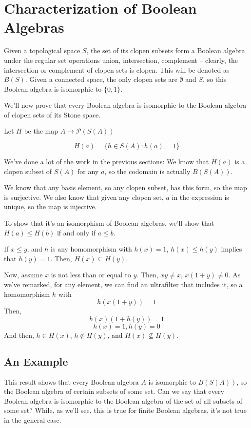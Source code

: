 \documentclass{article}
\begin{document}
    \section{Characterization of Boolean Algebras}

      Given a topological space $S$, the set of its clopen subsets form a
      Boolean algebra under the regular set operations union, intersection,
      complement -- clearly, the intersection or complement of clopen sets is
      clopen. This will be denoted as $B(S)$. Given a connected space, the only
      clopen sets are $\emptyset$ and $S$, so this Boolean algebra is isomorphic
      to $\{0,1\}$.

      We'll now prove that every Boolean algebra is isomorphic to the Boolean
      algebra of clopen sets of its Stone space.

      Let $H$ be the map $A \rightarrow \mathcal{P}(S(A))$

      \[H(a) = \{h \in S(A) : h(a) = 1\}\]

      We've done a lot of the work in the previous sections: We know that $H(a)$
      is a clopen subset of $S(A)$ for any $a$, so the codomain is actually
      $B(S(A))$.

      We know that any basis element, so any clopen subset, has this form, so
      the map is surjective.  We also know that given any clopen set, $a$ in the
      expression is unique, so the map is injective.

      To show that it's an isomorphism of Boolean algebras, we'll show that
      $H(a) \leq H(b)$ if and only if $a \leq b$.

      If $x \leq y$, and $h$ is any homomorphism with $h(x) = 1$, $h(x) \leq
      h(y)$ implies that $h(y) = 1$. Then, $H(x) \subseteq H(y)$.

      Now, assume $x$ is not less than or equal to $y$. Then, $xy \neq x$,
      $x(1+y) \neq 0$.  As we've remarked, for any element, we can find an
      ultrafilter that includes it, so a homomorphism $h$ with \[h(x(1+y)) = 1\]
      Then, \[h(x)(1+h(y)) = 1\] \[h(x) = 1, h(y) = 0\] And then, $h \in H(x)$,
      $h \notin  H(y)$, and $H(x) \nsubseteq H(y)$.

      \subsection{An Example}

        This result shows that every Boolean algebra $A$ is isomorphic to
        $B(S(A))$, so the Boolean algebra of certain subsets of some set. Can we
        say that every Boolean algebra is isomorphic to the Boolean algebra of
        the set of all subsets of some set? While, as we'll see, this is true
        for finite Boolean algebras, it's not true in the general case.
\end{document}
